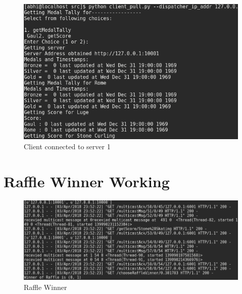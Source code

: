 \documentclass{article}
\begin{document}
\begin{figure}[H]
        \centering
        \includegraphics[width=\textwidth]{outputs/client_pull_server1.png}
        \caption{Client connected to server 1}
\end{figure}

\section{Raffle Winner Working}

\begin{figure}[H]
        \centering
        \includegraphics[width=\textwidth]{outputs/raffle_winner.png}
        \caption{Raffle Winner}
\end{figure}
\end{document}
